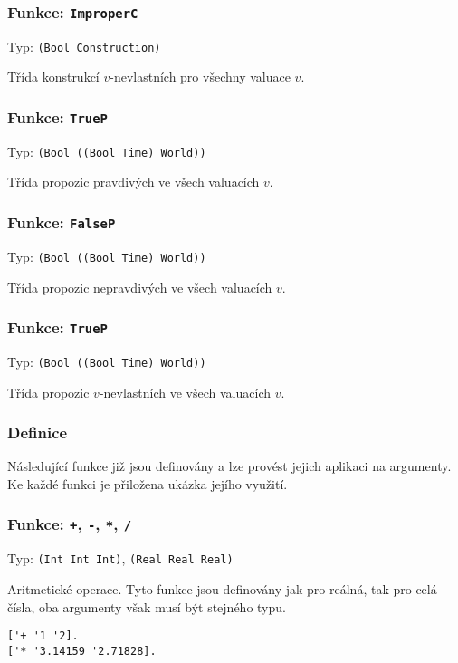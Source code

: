 \subsubsection*{Funkce: \lstinline|ImproperC|}
Typ: \lstinline|(Bool Construction)|

Třída konstrukcí $v$-nevlastních pro všechny valuace $v$.

\subsubsection*{Funkce: \lstinline|TrueP|}
Typ: \lstinline|(Bool ((Bool Time) World))|

Třída propozic pravdivých ve všech valuacích $v$.

\subsubsection*{Funkce: \lstinline|FalseP|}
Typ: \lstinline|(Bool ((Bool Time) World))|

Třída propozic nepravdivých ve všech valuacích $v$.

\subsubsection*{Funkce: \lstinline|TrueP|}
Typ: \lstinline|(Bool ((Bool Time) World))|

Třída propozic $v$-nevlastních ve všech valuacích $v$.

\subsubsection{Definice}

Následující funkce již jsou definovány a lze provést jejich aplikaci na argumenty. Ke každé
funkci je přiložena ukázka jejího využití.

\subsubsection*{Funkce: \lstinline|+|, \lstinline|-|, \lstinline|*|, \lstinline|/|}

Typ: \lstinline{(Int Int Int)}, \lstinline{(Real Real Real)}

Aritmetické operace. Tyto funkce jsou definovány jak pro reálná, tak pro celá čísla, oba argumenty
však musí být stejného typu.

\begin{lstlisting}[caption={Ukázka využití aritmetických operací}]
['+ '1 '2].
['* '3.14159 '2.71828].
\end{lstlisting}


